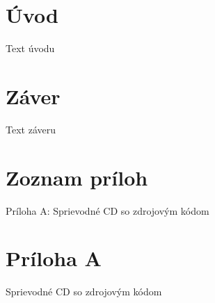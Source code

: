 \documentclass[a4paper,12pt]{article}
\begin{document}










\tableofcontents
{} 
\thispagestyle{empty}
\clearpage

\listoffigures
\thispagestyle{empty}
\clearpage

\listoftables
\thispagestyle{empty}
\clearpage

\lstlistoflistings
\thispagestyle{empty}
\clearpage

\printnomenclature
\clearpage

\section*{Úvod}

Text úvodu

\clearpage


\section*{Záver}

Text záveru

\clearpage

\nocite{*} %


\clearpage

\section*{Zoznam príloh}

Príloha A: Sprievodné CD so zdrojovým kódom

\clearpage

\section*{Príloha A}

Sprievodné CD so zdrojovým kódom

\clearpage
\end{document}
